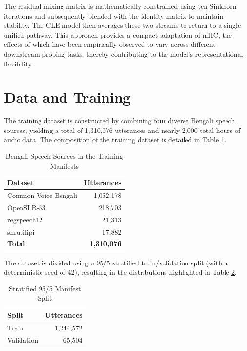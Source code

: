 The residual mixing matrix is mathematically constrained using ten Sinkhorn iterations and subsequently blended with the identity matrix to maintain stability. The CLE model then averages these two streams to return to a single unified pathway. This approach provides a compact adaptation of mHC, the effects of which have been empirically observed to vary across different downstream probing tasks, thereby contributing to the model's representational flexibility.

\section{Data and Training}
The training dataset is constructed by combining four diverse Bengali speech sources, yielding a total of 1,310,076 utterances and nearly 2,000 total hours of audio data. The composition of the training dataset is detailed in Table \ref{tab:speech_sources}.

\begin{table}[htbp]
  \centering
  \caption{Bengali Speech Sources in the Training Manifests}
  \label{tab:speech_sources}
  \renewcommand{\arraystretch}{1.3}
  \begin{tabular}{l r}
    \toprule
    \textbf{Dataset} & \textbf{Utterances} \\
    \midrule
    Common Voice Bengali & 1,052,178 \\
    OpenSLR-53 & 218,703 \\
    regspeech12 & 21,313 \\
    shrutilipi & 17,882 \\
    \midrule
    \textbf{Total} & \textbf{1,310,076} \\
    \bottomrule
  \end{tabular}
\end{table}

The dataset is divided using a 95/5 stratified train/validation split (with a deterministic seed of 42), resulting in the distributions highlighted in Table \ref{tab:dataset_split}.

\begin{table}[htbp]
  \centering
  \caption{Stratified 95/5 Manifest Split}
  \label{tab:dataset_split}
  \renewcommand{\arraystretch}{1.3}
  \begin{tabular}{l r}
    \toprule
    \textbf{Split} & \textbf{Utterances} \\
    \midrule
    Train & 1,244,572 \\
    Validation & 65,504 \\
    \bottomrule
  \end{tabular}
\end{table} 

